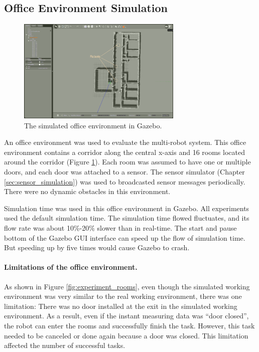 \subsection{Office Environment Simulation}
\label{sec:office_simulation}

\begin{figure}
  \centering
  \includegraphics[width = 0.7\textwidth]{content/images/ch5/gazebo_gui_environment.png}
  \caption{The simulated office environment in Gazebo.}
  \label{fig:gazebo_simulated_office}
\end{figure}

An office environment was used to evaluate the multi-robot system. This office environment contains a corridor along the central x-axis and 16 rooms located around the corridor (Figure \ref{fig:gazebo_simulated_office}). Each room was assumed to have one or multiple doors, and each door was attached to a sensor. The sensor simulator (Chapter \ref{sec:sensor_simulation}) was used to broadcasted sensor messages periodically. There were no dynamic obstacles in this environment.

Simulation time was used in this office environment in Gazebo. All experiments used the default simulation time. The simulation time flowed fluctuates, and its flow rate was about 10\%-20\% slower than in real-time. The start and pause bottom of the Gazebo GUI interface can speed up the flow of simulation time. But speeding up by five times would cause Gazebo to crash.

\paragraph{Limitations of the office environment.} As shown in Figure 
\ref{fig:experiment_rooms}, even though the simulated working environment was very similar to the real working environment, there was one limitation: There was no door installed at the exit in the simulated working environment. As a result, even if the instant measuring data was ``door closed'', the robot can enter the rooms and successfully finish the task. However, this task needed to be canceled or done again because a door was closed. This limitation affected the number of successful tasks. 

